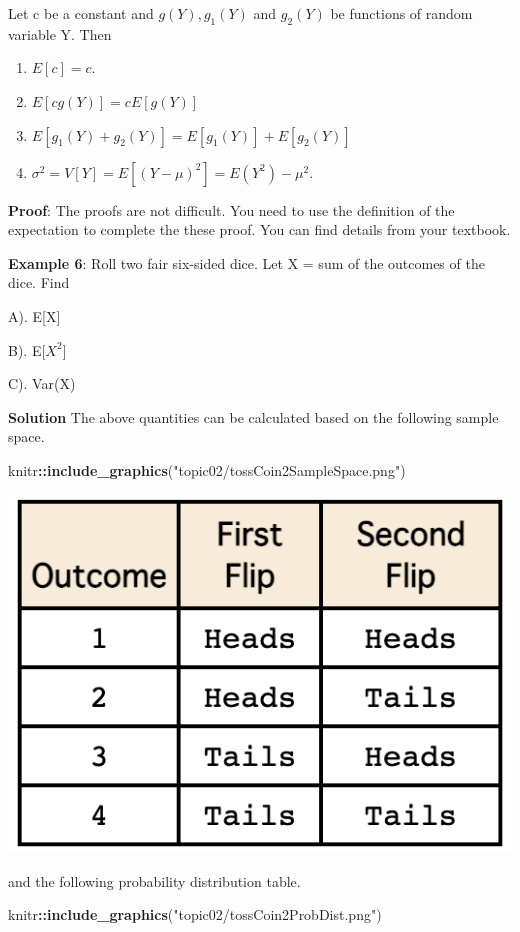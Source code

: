 \documentclass[
]{book}
\newenvironment{Shaded}{\begin{snugshade}}{\end{snugshade}}
\newcommand{\FunctionTok}[1]{\textcolor[rgb]{0.13,0.29,0.53}{\textbf{#1}}}
\newcommand{\NormalTok}[1]{#1}
\newcommand{\SpecialCharTok}[1]{\textcolor[rgb]{0.81,0.36,0.00}{\textbf{#1}}}
\newcommand{\StringTok}[1]{\textcolor[rgb]{0.31,0.60,0.02}{#1}}
\begin{document}
Let c be a constant and \(g(Y), g_1(Y)\) and \(g_2(Y)\) be functions of random variable Y. Then

\begin{enumerate}
\def\labelenumi{\arabic{enumi}.}
\item
  \(E[c] = c.\)
\item
  \(E[cg(Y)] = cE[g(Y)]\)
\item
  \(E[g_1(Y) + g_2(Y)] = E[g_1(Y)] + E[g_2(Y)]\)
\item
  \(\sigma^2 = V[Y] = E[(Y-\mu)^2] = E(Y^2) - \mu^2.\)
\end{enumerate}

\textbf{Proof}: The proofs are not difficult. You need to use the definition of the expectation to complete the these proof. You can find details from your textbook.

\textbf{Example 6}: Roll two fair six-sided dice. Let X = sum of the outcomes of the dice. Find

A). E{[}X{]}

B). E{[}\(X^2\){]}

C). Var(X)

\textbf{Solution} The above quantities can be calculated based on the following sample space.

\begin{Shaded}
\begin{Highlighting}[]
\NormalTok{knitr}\SpecialCharTok{::}\FunctionTok{include\_graphics}\NormalTok{(}\StringTok{"topic02/tossCoin2SampleSpace.png"}\NormalTok{)}
\end{Highlighting}
\end{Shaded}

\begin{center}\includegraphics[width=0.3\linewidth]{topic02/tossCoin2SampleSpace} \end{center}

and the following probability distribution table.

\begin{Shaded}
\begin{Highlighting}[]
\NormalTok{knitr}\SpecialCharTok{::}\FunctionTok{include\_graphics}\NormalTok{(}\StringTok{"topic02/tossCoin2ProbDist.png"}\NormalTok{)}
\end{Highlighting}
\end{Shaded}
\end{document}
